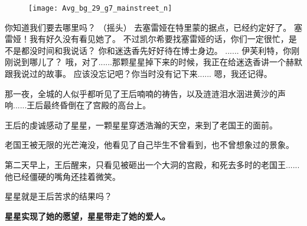 \documentclass[openany]{book}
\begin{document}
\begin{figure}[h]
    \centering
    \texttt{[image: Avg\_bg\_29\_g7\_mainstreet\_n]}
\end{figure}
\begin{dialogue}
     你知道我们要去哪里吗？
     （摇头）
     去塞雷娅在特里蒙的据点，已经约定好了。
     塞雷娅！我有好久没有看见她了。
     不过凯尔希要找塞雷娅的话，你们一定很忙，是不是都没时间和我说话？
     你和迷迭香先好好待在博士身边。
     ......
     伊芙利特，你刚刚说到哪儿了？
     哦，对了......那颗星星掉下来的时候，我正在给迷迭香讲一个赫默跟我说过的故事。
     应该没忘记吧？你当时没有记下来......
     嗯，我还记得。
\end{dialogue}
\par

那一夜，全城的人似乎都听见了王后喃喃的祷告，以及涟涟泪水洇进黄沙的声响......王后最终昏倒在了宫殿的高台上。\par
王后的虔诚感动了星星，一颗星星穿透浩瀚的天空，来到了老国王的面前。\par
老国王被无限的光芒淹没，他看见了自己毕生不曾看到，也不曾想象过的景象。\par
第二天早上，王后醒来，只看见被砸出一个大洞的宫殿，和死去多时的老国王......他已经僵硬的嘴角还挂着微笑。\par
星星就是王后苦求的结果吗？\par
\begin{center} \textbf{星星实现了她的愿望，星星带走了她的爱人。}\end{center}
\par
\end{document}

